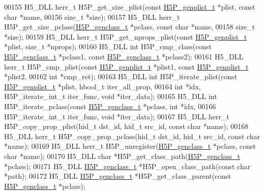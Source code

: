 \begin{DoxyCode}
00155 H5\_DLL herr\_t H5P\_get\_size\_plist(\textcolor{keyword}{const} \hyperlink{struct_h5_p__genplist__t}{H5P\_genplist\_t} *plist, \textcolor{keyword}{const} \textcolor{keywordtype}{char} *name,
00156     \textcolor{keywordtype}{size\_t} *size);
00157 H5\_DLL herr\_t H5P\_get\_size\_pclass(\hyperlink{struct_h5_p__genclass__t}{H5P\_genclass\_t} *pclass, \textcolor{keyword}{const} \textcolor{keywordtype}{char} *name,
00158     \textcolor{keywordtype}{size\_t} *size);
00159 H5\_DLL herr\_t H5P\_get\_nprops\_plist(\textcolor{keyword}{const} \hyperlink{struct_h5_p__genplist__t}{H5P\_genplist\_t} *plist, \textcolor{keywordtype}{size\_t} *nprops);
00160 H5\_DLL \textcolor{keywordtype}{int} H5P\_cmp\_class(\textcolor{keyword}{const} \hyperlink{struct_h5_p__genclass__t}{H5P\_genclass\_t} *pclass1, \textcolor{keyword}{const} 
      \hyperlink{struct_h5_p__genclass__t}{H5P\_genclass\_t} *pclass2);
00161 H5\_DLL herr\_t H5P\_cmp\_plist(\textcolor{keyword}{const} \hyperlink{struct_h5_p__genplist__t}{H5P\_genplist\_t} *plist1, \textcolor{keyword}{const} 
      \hyperlink{struct_h5_p__genplist__t}{H5P\_genplist\_t} *plist2,
00162     \textcolor{keywordtype}{int} *cmp\_ret);
00163 H5\_DLL \textcolor{keywordtype}{int} H5P\_iterate\_plist(\textcolor{keyword}{const} \hyperlink{struct_h5_p__genplist__t}{H5P\_genplist\_t} *plist, hbool\_t iter\_all\_prop,
00164     \textcolor{keywordtype}{int} *idx, H5P\_iterate\_int\_t iter\_func, \textcolor{keywordtype}{void} *iter\_data);
00165 H5\_DLL \textcolor{keywordtype}{int} H5P\_iterate\_pclass(\textcolor{keyword}{const} \hyperlink{struct_h5_p__genclass__t}{H5P\_genclass\_t} *pclass, \textcolor{keywordtype}{int} *idx,
00166     H5P\_iterate\_int\_t iter\_func, \textcolor{keywordtype}{void} *iter\_data);
00167 H5\_DLL herr\_t H5P\_copy\_prop\_plist(hid\_t dst\_id, hid\_t src\_id, \textcolor{keyword}{const} \textcolor{keywordtype}{char} *name);
00168 H5\_DLL herr\_t H5P\_copy\_prop\_pclass(hid\_t dst\_id, hid\_t src\_id, \textcolor{keyword}{const} \textcolor{keywordtype}{char} *name);
00169 H5\_DLL herr\_t H5P\_unregister(\hyperlink{struct_h5_p__genclass__t}{H5P\_genclass\_t} *pclass, \textcolor{keyword}{const} \textcolor{keywordtype}{char} *name);
00170 H5\_DLL \textcolor{keywordtype}{char} *H5P\_get\_class\_path(\hyperlink{struct_h5_p__genclass__t}{H5P\_genclass\_t} *pclass);
00171 H5\_DLL \hyperlink{struct_h5_p__genclass__t}{H5P\_genclass\_t} *H5P\_open\_class\_path(\textcolor{keyword}{const} \textcolor{keywordtype}{char} *path);
00172 H5\_DLL \hyperlink{struct_h5_p__genclass__t}{H5P\_genclass\_t} *H5P\_get\_class\_parent(\textcolor{keyword}{const} \hyperlink{struct_h5_p__genclass__t}{H5P\_genclass\_t} *pclass);

\end{DoxyCode}
